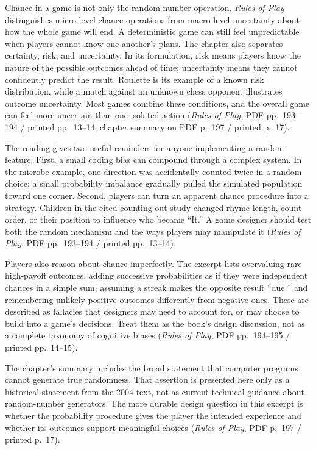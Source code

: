 \hypertarget{05-engine-i-ch009-chance-has-a-mechanism-a-strategy-and-a-players-interpretation}{}

Chance in a game is not only the random-number operation. \emph{Rules of Play} distinguishes micro-level chance operations from macro-level uncertainty about how the whole game will end. A deterministic game can still feel unpredictable when players cannot know one another's plans. The chapter also separates certainty, risk, and uncertainty. In its formulation, risk means players know the nature of the possible outcomes ahead of time; uncertainty means they cannot confidently predict the result. Roulette is its example of a known risk distribution, while a match against an unknown chess opponent illustrates outcome uncertainty. Most games combine these conditions, and the overall game can feel more uncertain than one isolated action (\emph{Rules of Play}, PDF pp.~193--194 / printed pp.~13--14; chapter summary on PDF p.~197 / printed p.~17).

The reading gives two useful reminders for anyone implementing a random feature. First, a small coding bias can compound through a complex system. In the microbe example, one direction was accidentally counted twice in a random choice; a small probability imbalance gradually pulled the simulated population toward one corner. Second, players can turn an apparent chance procedure into a strategy. Children in the cited counting-out study changed rhyme length, count order, or their position to influence who became ``It.'' A game designer should test both the random mechanism and the ways players may manipulate it (\emph{Rules of Play}, PDF pp.~193--194 / printed pp.~13--14).

Players also reason about chance imperfectly. The excerpt lists overvaluing rare high-payoff outcomes, adding successive probabilities as if they were independent chances in a simple sum, assuming a streak makes the opposite result ``due,'' and remembering unlikely positive outcomes differently from negative ones. These are described as fallacies that designers may need to account for, or may choose to build into a game's decisions. Treat them as the book's design discussion, not as a complete taxonomy of cognitive biases (\emph{Rules of Play}, PDF pp.~194--195 / printed pp.~14--15).

The chapter's summary includes the broad statement that computer programs cannot generate true randomness. That assertion is presented here only as a historical statement from the 2004 text, not as current technical guidance about random-number generators. The more durable design question in this excerpt is whether the probability procedure gives the player the intended experience and whether its outcomes support meaningful choices (\emph{Rules of Play}, PDF p.~197 / printed p.~17).


